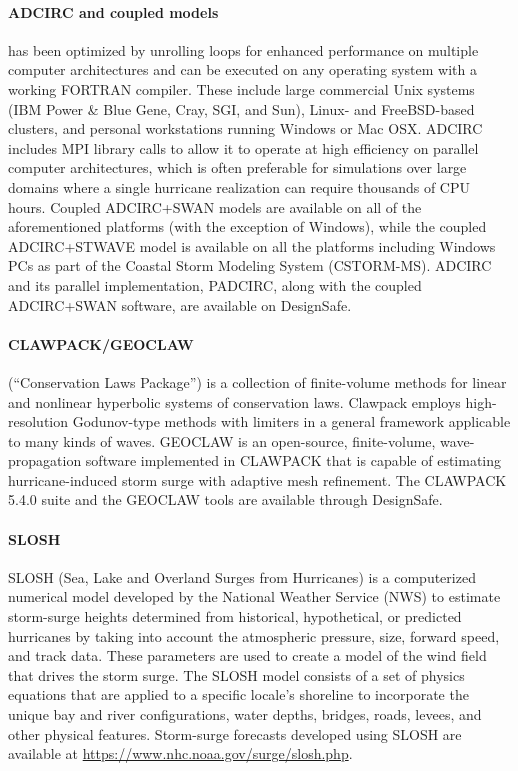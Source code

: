 \paragraph{ADCIRC and coupled models}  has been optimized by unrolling loops for enhanced performance on multiple computer architectures and can be executed on any operating system with a working FORTRAN compiler. These include large commercial Unix systems (IBM Power \& Blue Gene, Cray, SGI, and Sun), Linux- and FreeBSD-based clusters, and personal workstations running Windows or Mac OSX. ADCIRC includes MPI library calls to allow it to operate at high efficiency on parallel computer architectures, which is often preferable for simulations over large domains where a single hurricane realization can require thousands of CPU hours. Coupled ADCIRC+SWAN models are available on all of the aforementioned platforms (with the exception of Windows), while the coupled ADCIRC+STWAVE model is available on all the platforms including Windows PCs as part of the Coastal Storm Modeling System (CSTORM-MS). ADCIRC and its parallel implementation, PADCIRC, along with the coupled ADCIRC+SWAN software, are available on DesignSafe.

\paragraph{CLAWPACK/GEOCLAW}  (``Conservation Laws Package'') is a collection of finite-volume methods for linear and nonlinear hyperbolic systems of conservation laws. Clawpack employs high-resolution Godunov-type methods with limiters in a general framework applicable to many kinds of waves. GEOCLAW is an open-source, finite-volume, wave-propagation software implemented in CLAWPACK that is capable of estimating hurricane-induced storm surge with adaptive mesh refinement. The CLAWPACK 5.4.0 suite and the GEOCLAW tools are available through DesignSafe.

\paragraph{SLOSH} SLOSH (Sea, Lake and Overland Surges from Hurricanes) is a computerized numerical model developed by the National Weather Service (NWS) to estimate storm-surge heights determined from historical, hypothetical, or predicted hurricanes by taking into account the atmospheric pressure, size, forward speed, and track data. These parameters are used to create a model of the wind field that drives the storm surge. The SLOSH model consists of a set of physics equations that are applied to a specific locale's shoreline to incorporate the unique bay and river configurations, water depths, bridges, roads, levees, and other physical features. Storm-surge forecasts developed using SLOSH are available at \url{https://www.nhc.noaa.gov/surge/slosh.php}.

